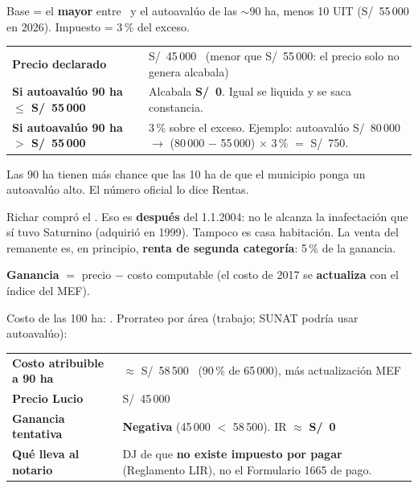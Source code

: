 \documentclass[12pt,a4paper]{article}
\begin{document}
Base = el \textbf{mayor} entre \PrecioRemanenteLucio\ y el autoavalúo de las $\sim$90 ha, menos 10 UIT (S/\ 55\,000 en 2026). Impuesto = 3\,\% del exceso.

{\small\renewcommand{\arraystretch}{1.2}
\noindent\begin{tabularx}{\textwidth}{>{\bfseries}p{5.2cm} X}
Precio declarado & S/\ 45\,000 \ (menor que S/\ 55\,000: el precio solo no genera alcabala) \\
Si autoavalúo 90 ha $\leq$ S/\ 55\,000 & Alcabala \textbf{S/\ 0}. Igual se liquida y se saca constancia. \\
Si autoavalúo 90 ha $>$ S/\ 55\,000 & 3\,\% sobre el exceso. Ejemplo: autoavalúo S/\ 80\,000 $\rightarrow$ (80\,000 $-$ 55\,000) $\times$ 3\,\% $=$ S/\ 750. \\
\end{tabularx}}

\vspace{0.2em}
\noindent Las 90 ha tienen más chance que las 10 ha de que el municipio ponga un autoavalúo alto. El número oficial lo dice Rentas.

Richar compró el \FechaAdquisicionRichar. Eso es \textbf{después} del 1.1.2004: no le alcanza la inafectación que sí tuvo Saturnino (adquirió en 1999). Tampoco es casa habitación. La venta del remanente es, en principio, \textbf{renta de segunda categoría}: 5\,\% de la ganancia.

\textbf{Ganancia} $=$ precio $-$ costo computable (el costo de 2017 se \textbf{actualiza} con el índice del MEF).

Costo de las 100 ha: \PrecioAdquisicionMatriz. Prorrateo por área (trabajo; SUNAT podría usar autoavalúo):

{\small\renewcommand{\arraystretch}{1.2}
\noindent\begin{tabularx}{\textwidth}{>{\bfseries}p{4.8cm} X}
Costo atribuible a 90 ha & $\approx$ S/\ 58\,500 \ (90\,\% de 65\,000), más actualización MEF \\
Precio Lucio & S/\ 45\,000 \\
Ganancia tentativa & \textbf{Negativa} (45\,000 $<$ 58\,500). IR $\approx$ \textbf{S/\ 0} \\
Qué lleva al notario & DJ de que \textbf{no existe impuesto por pagar} (Reglamento LIR), no el Formulario 1665 de pago. \\
\end{tabularx}}
\end{document}
